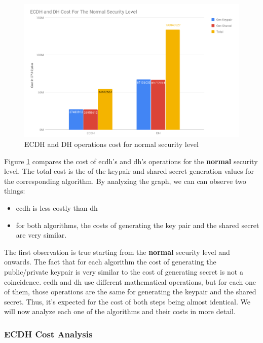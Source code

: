 \documentclass{llncs}
\begin{document}
\begin{figure}
  \centering
  \includegraphics[width=1.0\textwidth]{img/ecdh-dh-cost-normal-sl.png}
  \caption{\label{fig:ecdh-dh-cost-normal-sl} ECDH and DH operations cost for normal security level}
\end{figure}

Figure \ref{fig:ecdh-dh-cost-normal-sl} compares the cost of \gls{ecdh}'s and \gls{dh}'s operations for the \textbf{normal} security level.
The total cost is the of the keypair and shared secret generation values for the corresponding algorithm. By analyzing the graph, we can can 
observe two things:

\begin{itemize}
  \item \gls{ecdh} is less costly than \gls{dh}
  \item for both algorithms, the costs of generating the key pair and the shared secret are very similar.
\end{itemize}

The first observation is true starting from the \textbf{normal} security level and onwards.
The fact that for each algorithm the cost of generating the public/private keypair is very similar to the cost of generating secret is not a coincidence.
\gls{ecdh} and \gls{dh} use different mathematical operations, but for each one of them, those operations are the same for generating the keypair 
and the shared secret. Thus, it's expected for the cost of both steps being almost identical. We will now analyze each one of the algorithms and 
their costs in more detail.

\subsubsection{ECDH Cost Analysis}
\end{document}
